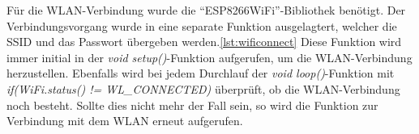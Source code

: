Für die WLAN-Verbindung wurde die "`ESP8266WiFi"'-Bibliothek benötigt.
Der Verbindungsvorgang wurde in eine separate Funktion ausgelagtert, welcher die SSID und das Passwort übergeben werden.\ref{lst:wificonnect}
Diese Funktion wird immer initial in der \textit{void setup()}-Funktion aufgerufen, um die WLAN-Verbindung herzustellen.
Ebenfalls wird bei jedem Durchlauf der \textit{void loop()}-Funktion mit \textit{if(WiFi.status() != WL\_CONNECTED)} überprüft, ob die WLAN-Verbindung noch besteht.
Sollte dies nicht mehr der Fall sein, so wird die Funktion zur Verbindung mit dem WLAN erneut aufgerufen.